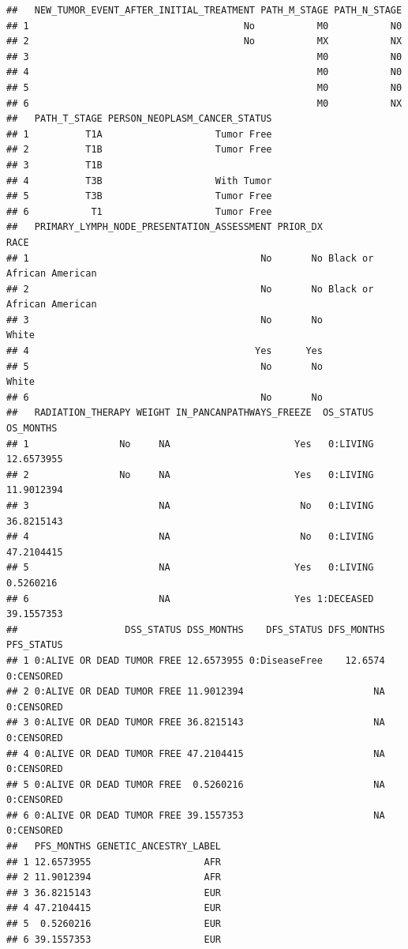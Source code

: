\documentclass[
]{article}
\begin{document}
\begin{verbatim}
##   NEW_TUMOR_EVENT_AFTER_INITIAL_TREATMENT PATH_M_STAGE PATH_N_STAGE
## 1                                      No           M0           N0
## 2                                      No           MX           NX
## 3                                                   M0           N0
## 4                                                   M0           N0
## 5                                                   M0           N0
## 6                                                   M0           NX
##   PATH_T_STAGE PERSON_NEOPLASM_CANCER_STATUS
## 1          T1A                    Tumor Free
## 2          T1B                    Tumor Free
## 3          T1B                              
## 4          T3B                    With Tumor
## 5          T3B                    Tumor Free
## 6           T1                    Tumor Free
##   PRIMARY_LYMPH_NODE_PRESENTATION_ASSESSMENT PRIOR_DX                      RACE
## 1                                         No       No Black or African American
## 2                                         No       No Black or African American
## 3                                         No       No                     White
## 4                                        Yes      Yes                          
## 5                                         No       No                     White
## 6                                         No       No                          
##   RADIATION_THERAPY WEIGHT IN_PANCANPATHWAYS_FREEZE  OS_STATUS  OS_MONTHS
## 1                No     NA                      Yes   0:LIVING 12.6573955
## 2                No     NA                      Yes   0:LIVING 11.9012394
## 3                       NA                       No   0:LIVING 36.8215143
## 4                       NA                       No   0:LIVING 47.2104415
## 5                       NA                      Yes   0:LIVING  0.5260216
## 6                       NA                      Yes 1:DECEASED 39.1557353
##                   DSS_STATUS DSS_MONTHS    DFS_STATUS DFS_MONTHS PFS_STATUS
## 1 0:ALIVE OR DEAD TUMOR FREE 12.6573955 0:DiseaseFree    12.6574 0:CENSORED
## 2 0:ALIVE OR DEAD TUMOR FREE 11.9012394                       NA 0:CENSORED
## 3 0:ALIVE OR DEAD TUMOR FREE 36.8215143                       NA 0:CENSORED
## 4 0:ALIVE OR DEAD TUMOR FREE 47.2104415                       NA 0:CENSORED
## 5 0:ALIVE OR DEAD TUMOR FREE  0.5260216                       NA 0:CENSORED
## 6 0:ALIVE OR DEAD TUMOR FREE 39.1557353                       NA 0:CENSORED
##   PFS_MONTHS GENETIC_ANCESTRY_LABEL
## 1 12.6573955                    AFR
## 2 11.9012394                    AFR
## 3 36.8215143                    EUR
## 4 47.2104415                    EUR
## 5  0.5260216                    EUR
## 6 39.1557353                    EUR
\end{verbatim}
\end{document}
